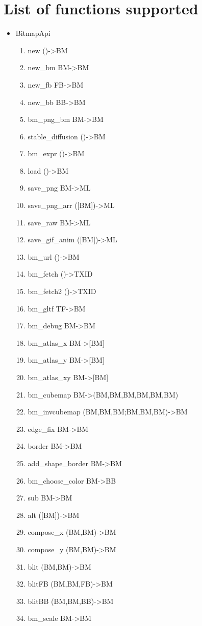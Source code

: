 \documentclass[11pt,twoside,a4paper]{article}
\begin{document}
\section{List of functions supported}
\begin{itemize}
  \item BitmapApi
\begin{enumerate}
\item new ()->BM
\item new\_bm BM->BM
\item new\_fb FB->BM
\item new\_bb BB->BM
\item bm\_png\_bm BM->BM
\item stable\_diffusion ()->BM
\item bm\_expr ()->BM
\item load ()->BM
\item save\_png BM->ML
\item save\_png\_arr ([BM])->ML
\item save\_raw BM->ML 
\item save\_gif\_anim ([BM])->ML
\item bm\_url ()->BM
\item bm\_fetch ()->TXID
\item bm\_fetch2 ()->TXID
\item bm\_gltf TF->BM
\item bm\_debug BM->BM
\item bm\_atlas\_x BM->[BM]
\item bm\_atlas\_y BM->[BM]
\item bm\_atlas\_xy BM->[BM]
\item bm\_cubemap BM->(BM,BM,BM,BM,BM,BM)
\item bm\_invcubemap (BM,BM,BM;BM,BM,BM)->BM
\item edge\_fix BM->BM
\item border BM->BM 
\item add\_shape\_border BM->BM
\item bm\_choose\_color BM->BB
\item sub BM->BM
\item alt ([BM])->BM
\item compose\_x (BM,BM)->BM
\item compose\_y (BM,BM)->BM
\item blit (BM,BM)->BM
\item blitFB (BM,BM,FB)->BM
\item blitBB (BM,BM,BB)->BM
\item bm\_scale BM->BM

\end{enumerate}
\end{itemize}
\end{document}
